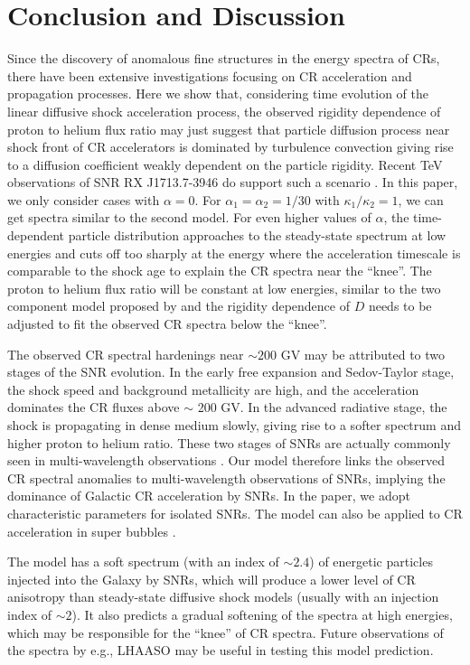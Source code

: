 \documentclass[apj]{emulateapj}
\begin{document}
\section{Conclusion and Discussion}\label{sec4}
Since the discovery of anomalous fine structures in the energy spectra of CRs, there have been extensive investigations focusing on CR acceleration and propagation processes. Here we show that, considering time evolution of the linear diffusive shock acceleration process, the observed rigidity dependence of proton to helium flux ratio may just suggest that particle diffusion process near shock front of CR accelerators is dominated by turbulence convection giving rise to a diffusion coefficient weakly dependent on the particle rigidity. Recent TeV observations of SNR RX J1713.7-3946 do support such a scenario \citep{2016arXiv160908671H}. In this paper, we only consider cases with $ \alpha=0 $. For $ \alpha_1=\alpha_2=1/30 $ with $ \kappa_1/\kappa_2=1 $, we can get spectra similar to the second model. For even higher values of $\alpha$, the time-dependent particle distribution approaches to the steady-state spectrum at low energies and cuts off too sharply at the energy where the acceleration timescale is comparable to the shock age to explain the CR spectra near the ``knee''. The proton to helium flux ratio will be constant at low energies, similar to the two component model proposed by \citet{2015ApJ...815L...1T} and the rigidity dependence of $ D $ needs to be adjusted to fit the observed CR spectra below the ``knee''.

The observed CR spectral hardenings near $\sim 200$ GV may be attributed to two stages of the SNR evolution. In the early free expansion and Sedov-Taylor stage, the shock speed and background metallicity are high, and the acceleration dominates the CR fluxes above $\sim$ 200 GV. In the advanced radiative stage, the shock is propagating in dense medium slowly, giving rise to a softer spectrum and higher proton to helium ratio. These two stages of SNRs are actually commonly seen in multi-wavelength observations \citep{Helder2012, 2017ApJ...834..153Z}. Our model therefore links the observed CR spectral anomalies to multi-wavelength observations of SNRs, implying the dominance of Galactic CR acceleration by SNRs. In the paper, we adopt characteristic parameters for isolated SNRs. The model can also be applied to CR acceleration in super bubbles \citep{Ohira16}.
 
The model has a soft spectrum (with an index of $\sim 2.4$) of energetic particles  injected into the Galaxy by SNRs, which will produce a lower level of CR anisotropy than steady-state diffusive shock models (usually with an injection index of $\sim 2$). It also predicts a gradual softening of the spectra at high energies, which may be responsible for the ``knee'' of CR spectra. Future observations of the spectra by e.g., LHAASO may be useful in testing this model prediction. 
\end{document}
